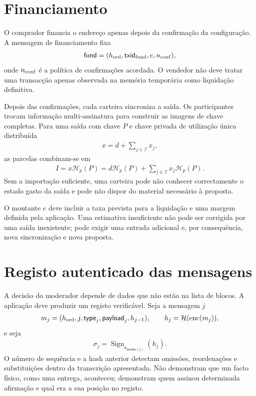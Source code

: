 \section{Financiamento}
\label{sec:escrow-funding}

O comprador financia o endereço apenas depois da confirmação da configuração.
A mensagem de financiamento fixa
\begin{align}
 \mathsf{fund}=
 (h_{\rm ord},\mathsf{txid}_{\rm fund},e,n_{\rm conf}),
 \label{eq:escrow-funding-record}
\end{align}
onde \(n_{\rm conf}\) é a política de confirmações acordada. O vendedor não
deve tratar uma transacção apenas observada na memória temporária como
liquidação definitiva.

Depois das confirmações, cada carteira sincroniza a saída. Os participantes
trocam informação multi-assinatura para construir as imagens de chave
completas. Para uma saída com chave \(P\) e chave privada de utilização única
distribuída
\begin{align*}
 x=d+\sum_{j\in\mathcal I}x_j,
\end{align*}
as parcelas combinam-se em
\begin{align}
 I=x\mathcal H_p(P)
  =d\mathcal H_p(P)+
    \sum_{j\in\mathcal I}x_j\mathcal H_p(P).
 \label{eq:escrow-key-image}
\end{align}
Sem a importação suficiente, uma carteira pode não conhecer correctamente o
estado gasto da saída e pode não dispor do material necessário à proposta.

O montante \(e\) deve incluir a taxa prevista para a liquidação e uma margem
definida pela aplicação. Uma estimativa insuficiente não pode ser corrigida
por uma saída inexistente; pode exigir uma entrada adicional e, por
consequência, nova sincronização e nova proposta.

\section{Registo autenticado das mensagens}
\label{sec:escrow-authenticated-log}

A decisão do moderador depende de dados que não estão na lista de blocos. A
aplicação deve produzir um registo verificável. Seja a mensagem \(j\)
\begin{align}
 m_j=(
 h_{\rm ord},j,\mathsf{type}_j,\mathsf{payload}_j,h_{j-1}),
 \qquad
 h_j=\mathcal H(\operatorname{enc}(m_j)),
 \label{eq:escrow-message-chain}
\end{align}
e seja
\begin{align}
 \sigma_j=\operatorname{Sign}_{a_{\mathsf{sender}(j)}}(h_j).
 \label{eq:escrow-message-signature}
\end{align}
O número de sequência e a hash anterior detectam omissões, reordenações e
substituições dentro da transcrição apresentada. Não demonstram que um facto
físico, como uma entrega, aconteceu; demonstram quem assinou determinada
afirmação e qual era a sua posição no registo.

